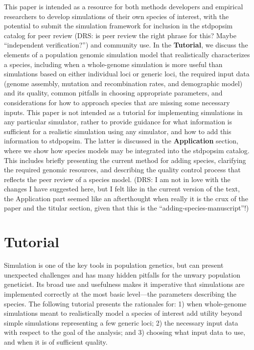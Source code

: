 \documentclass[hidelinks]{article}
\begin{document}
This paper is intended as a resource for both methods
developers and empirical researchers to develop simulations of their own
species of interest, with the potential to submit the simulation
framework for inclusion in the stdpopsim catalog for peer review
(DRS: is peer review the right phrase for this? Maybe ``independent verification?'') and
community use. In the \textbf{Tutorial}, we discuss the elements of a
population genomic simulation model that realistically characterizes a
species, including when a whole-genome simulation is more useful than
simulations based on either individual loci or generic loci, the required input data (genome
assembly, mutation and recombination rates, and demographic model) and
its quality, common pitfalls in choosing appropriate parameters, and
considerations for how to approach species that are missing some
necessary inputs. This paper is not intended as a tutorial for
implementing simulations in any particular simulator, rather to provide
guidance for what information is sufficient for a realistic simulation
using any simulator, and how to add this information to stdpopsim. The latter 
is discussed in the \textbf{Application} section, where we show how
species models may be integrated into the stdpopsim catalog. This includes
briefly presenting the current method for adding species, clarifying the
required genomic resources, and describing the quality control process
that reflects the peer review of a species model.
(DRS: I am not in love with the changes I have suggested here,
but I felt like in the current version of the text, the Application
part seemed like an afterthought when really it is the crux of the paper
and the titular section, given that this is the ``adding-species-manuscript''!)

\hypertarget{tutorial}{%
\section*{Tutorial}\label{tutorial}}

Simulation is one of the key tools in population genetics, but can
present unexpected challenges and has many hidden pitfalls for the
unwary population geneticist. Its broad use and usefulness makes it
imperative that simulations are implemented correctly at the most basic
level---the parameters describing the species. The following tutorial
presents the rationales for: 1) when whole-genome simulations meant to
realistically model a species of interest add utility beyond simple
simulations representing a few generic loci; 2) the necessary input data
with respect to the goal of the analysis; and 3) choosing what input
data to use, and when it is of sufficient quality.
\end{document}
